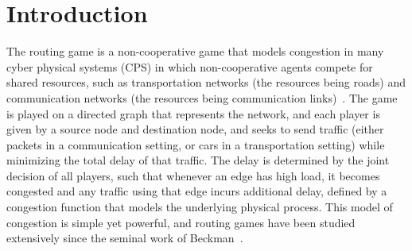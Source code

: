 \documentclass{sig-alternate-ipsn13}
\begin{document}
\section{Introduction}
The routing game is a non-cooperative game that models congestion in many cyber physical systems (CPS) in which non-cooperative agents compete for shared resources, such as transportation networks (the resources being roads) and communication networks (the resources being communication links)~\cite{beckmann1955studies,roughgarden2007,ozdaglar2007incentives}. The game is played on a directed graph that represents the network, and each player is given by a source node and destination node, and seeks to send traffic (either packets in a communication setting, or cars in a  transportation setting) while minimizing the total delay of that traffic. The delay is determined by the joint decision of all players, such that whenever an edge has high load, it becomes congested and any traffic using that edge incurs additional delay, defined by a congestion function that models the underlying physical process. This model of congestion is simple yet powerful, and routing games have been studied extensively since the seminal work of Beckman~\cite{beckmann1955studies}.
\end{document}
